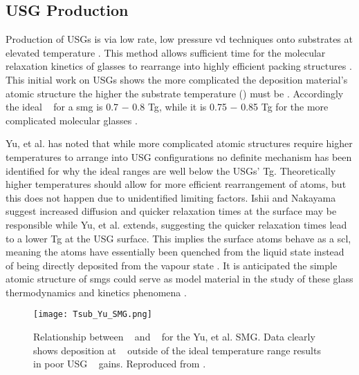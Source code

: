 \documentclass[a4paper,12pt,oneside]{report}%
\begin{document}
\subsection{USG Production}
Production of USGs is via low rate, low pressure \gls{vd} techniques onto substrates at elevated temperature \cite{Ishii2014, Aji2013, Yu2013, Wang2014, Nakayama2013}. This method allows sufficient time for the molecular relaxation kinetics of glasses to rearrange into highly efficient packing structures \cite{Aji2013, Swallen2007, Wang2014}. This initial work on USGs shows the more complicated the deposition material's atomic structure the higher the substrate temperature (\Tsub) must be \cite{Yu2013}. Accordingly the ideal \Tsub~ for a \gls{smg} is 0.7 $-$ 0.8 \gls{Tg}, while it is 0.75 $-$ 0.85 \gls{Tg} for the more complicated molecular glasses \cite{Swallen2007, Dawson2011, Yu2013, Dawson2010, Kearns2008}. 
 
Yu, et al. \cite{Yu2013} has noted that while more complicated atomic structures require higher temperatures to arrange into USG configurations no definite mechanism has been identified for why the ideal ranges are well below the USGs' \gls{Tg}. Theoretically higher temperatures should allow for more efficient rearrangement of atoms, but this does not happen due to unidentified limiting factors. Ishii and Nakayama \cite{Ishii2014} suggest increased diffusion and quicker relaxation times at the surface may be responsible while Yu, et al. \cite{Yu2013} extends, suggesting the quicker relaxation times lead to a lower \gls{Tg} at the USG surface. This implies the surface atoms behave as a \gls{scl}, meaning the atoms have essentially been quenched from the liquid state instead of being directly deposited from the vapour state \cite{Yu2013}. It is anticipated the simple atomic structure of \glspl{smg} could serve as model material in the study of these glass thermodynamics and kinetics phenomena \cite{Yu2013, Wang2014}. 

\begin{figure}[htbp]
	\centering
	\texttt{[image: Tsub\_Yu\_SMG.png]}
	\caption[Relationship between \Tsub~ and \dTg~ for the Yu, et al. SMG. Data clearly shows deposition at \Tsub~ outside of the ideal temperature range results in poor USG \dTg~ gains.]{Relationship between \Tsub~ and \dTg~ for the Yu, et al. \cite{Yu2013} SMG. Data clearly shows deposition at \Tsub~ outside of the ideal temperature range results in poor USG \dTg~ gains. Reproduced from \cite{Yu2013}.}
	\label{fig:YuTsub}
\end{figure}
\end{document}
